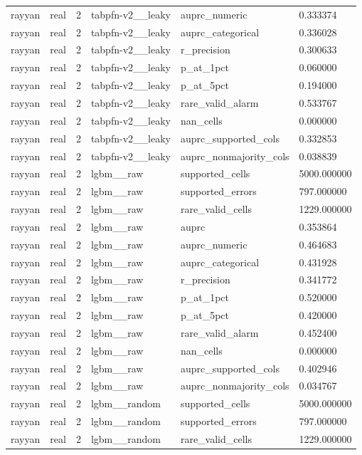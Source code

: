 \begin{tabular}{llllll}
rayyan & real & 2 & tabpfn-v2\_\_leaky & auprc\_numeric & 0.333374 \\
rayyan & real & 2 & tabpfn-v2\_\_leaky & auprc\_categorical & 0.336028 \\
rayyan & real & 2 & tabpfn-v2\_\_leaky & r\_precision & 0.300633 \\
rayyan & real & 2 & tabpfn-v2\_\_leaky & p\_at\_1pct & 0.060000 \\
rayyan & real & 2 & tabpfn-v2\_\_leaky & p\_at\_5pct & 0.194000 \\
rayyan & real & 2 & tabpfn-v2\_\_leaky & rare\_valid\_alarm & 0.533767 \\
rayyan & real & 2 & tabpfn-v2\_\_leaky & nan\_cells & 0.000000 \\
rayyan & real & 2 & tabpfn-v2\_\_leaky & auprc\_supported\_cols & 0.332853 \\
rayyan & real & 2 & tabpfn-v2\_\_leaky & auprc\_nonmajority\_cols & 0.038839 \\
rayyan & real & 2 & lgbm\_\_raw & supported\_cells & 5000.000000 \\
rayyan & real & 2 & lgbm\_\_raw & supported\_errors & 797.000000 \\
rayyan & real & 2 & lgbm\_\_raw & rare\_valid\_cells & 1229.000000 \\
rayyan & real & 2 & lgbm\_\_raw & auprc & 0.353864 \\
rayyan & real & 2 & lgbm\_\_raw & auprc\_numeric & 0.464683 \\
rayyan & real & 2 & lgbm\_\_raw & auprc\_categorical & 0.431928 \\
rayyan & real & 2 & lgbm\_\_raw & r\_precision & 0.341772 \\
rayyan & real & 2 & lgbm\_\_raw & p\_at\_1pct & 0.520000 \\
rayyan & real & 2 & lgbm\_\_raw & p\_at\_5pct & 0.420000 \\
rayyan & real & 2 & lgbm\_\_raw & rare\_valid\_alarm & 0.452400 \\
rayyan & real & 2 & lgbm\_\_raw & nan\_cells & 0.000000 \\
rayyan & real & 2 & lgbm\_\_raw & auprc\_supported\_cols & 0.402946 \\
rayyan & real & 2 & lgbm\_\_raw & auprc\_nonmajority\_cols & 0.034767 \\
rayyan & real & 2 & lgbm\_\_random & supported\_cells & 5000.000000 \\
rayyan & real & 2 & lgbm\_\_random & supported\_errors & 797.000000 \\
rayyan & real & 2 & lgbm\_\_random & rare\_valid\_cells & 1229.000000 \\

\end{tabular}
